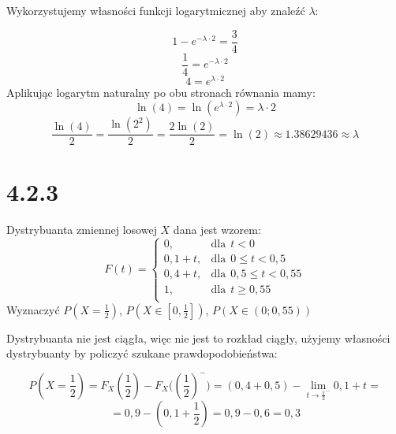 \documentclass{article}
\begin{document}
Wykorzystujemy własności funkcji logarytmicznej aby znaleźć \(\lambda\):

\begin{equation*}
    1 - e^{- \lambda \cdot 2} = \frac{3}{4}
\end{equation*}
\begin{equation*}
    \frac{1}{4} = e^{- \lambda \cdot 2}
\end{equation*}
\begin{equation*}
    4 = e^{\lambda \cdot 2}
\end{equation*}
Aplikując logarytm naturalny po obu stronach równania mamy:
\begin{equation*}
    \ln(4) = \ln(e^{\lambda \cdot 2}) = \lambda \cdot 2
\end{equation*}
\begin{equation*}
    \frac{\ln(4)}{2} = \frac{\ln(2^2)}{2} = \frac{2 \ln(2)}{2} = \ln(2) \approx 1.38629436 \approx \lambda
\end{equation*}

\section*{4.2.3}

\begin{center}
    Dystrybuanta zmiennej losowej \(X\) dana jest wzorem:
    \begin{equation*}
        F(t) = 
            \begin{cases}
                0, & \text{dla} \ \  t < 0 \\
                0,1 + t, & \text{dla} \ \   0 \leq t < 0,5\\
                0,4 + t, & \text{dla} \ \  0,5 \leq t < 0,55\\
                1, & \text{dla} \ \  t \geq 0,55\\
            \end{cases}
    \end{equation*}
    Wyznaczyć \(P(X = \frac{1}{2})\), \(P(X \in [0, \frac{1}{2}])\), \(P(X \in (0; 0,55))\)
\end{center}

Dystrybuanta nie jest ciągła, więc nie jest to rozkład ciągły, użyjemy własności dystrybuanty
by policzyć szukane prawdopodobieństwa:

\begin{equation*}
    P(X = \frac{1}{2}) = F_{X}(\frac{1}{2}) - F_{X}\Big((\frac{1}{2})^{-}\Big) = (0,4 + 0,5) - \lim_{t \to \frac{1}{2}^{-}} 0,1 + t =
\end{equation*}
\begin{equation*}
    = 0,9 - (0,1 + \frac{1}{2}) = 0,9 - 0,6 = 0,3
\end{equation*}
\end{document}

